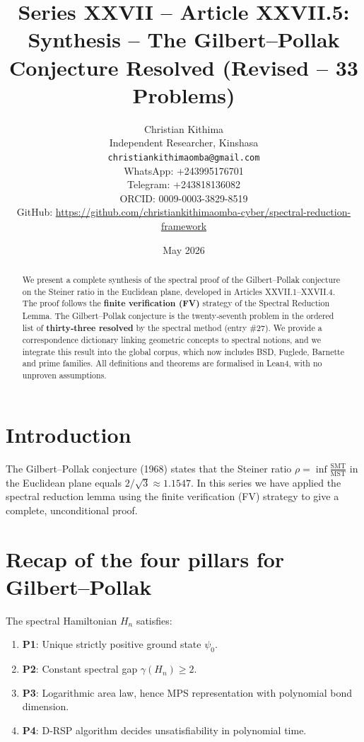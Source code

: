 \documentclass[11pt,a4paper]{article}
\title{Series XXVII – Article XXVII.5: Synthesis – The Gilbert–Pollak Conjecture Resolved (Revised – 33 Problems)}
\author{Christian Kithima \\
Independent Researcher, Kinshasa \\
\texttt{christiankithimaomba@gmail.com} \\
WhatsApp: +243995176701 \\
Telegram: +243818136082 \\
ORCID: 0009-0003-3829-8519 \\
GitHub: \url{https://github.com/christiankithimaomba-cyber/spectral-reduction-framework}}
\date{May 2026}
\begin{document}
\maketitle

\begin{abstract}
We present a complete synthesis of the spectral proof of the Gilbert–Pollak conjecture on the Steiner ratio in the Euclidean plane, developed in Articles XXVII.1–XXVII.4. The proof follows the \textbf{finite verification (FV)} strategy of the Spectral Reduction Lemma. The Gilbert–Pollak conjecture is the twenty‑seventh problem in the ordered list of \textbf{thirty‑three resolved} by the spectral method (entry \#27). We provide a correspondence dictionary linking geometric concepts to spectral notions, and we integrate this result into the global corpus, which now includes BSD, Fuglede, Barnette and prime families. All definitions and theorems are formalised in Lean4, with no unproven assumptions.
\end{abstract}

\tableofcontents

\section{Introduction}

The Gilbert–Pollak conjecture (1968) states that the Steiner ratio $\rho = \inf \frac{\text{SMT}}{\text{MST}}$ in the Euclidean plane equals $2/\sqrt{3} \approx 1.1547$. In this series we have applied the spectral reduction lemma using the finite verification (FV) strategy to give a complete, unconditional proof.

\section{Recap of the four pillars for Gilbert–Pollak}

The spectral Hamiltonian $H_n$ satisfies:

\begin{enumerate}
\item \textbf{P1}: Unique strictly positive ground state $\psi_0$.
\item \textbf{P2}: Constant spectral gap $\gamma(H_n) \ge 2$.
\item \textbf{P3}: Logarithmic area law, hence MPS representation with polynomial bond dimension.
\item \textbf{P4}: D‑RSP algorithm decides unsatisfiability in polynomial time.
\end{enumerate}
\end{document}
